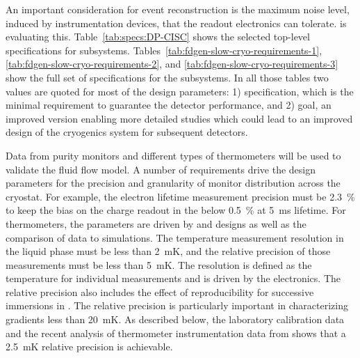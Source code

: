 An important consideration for event reconstruction is the maximum noise level, induced by instrumentation devices, that the readout electronics  can tolerate.  is evaluating this. Table~\ref{tab:specs:DP-CISC} shows the selected top-level specifications for  subsystems. 
Tables~\ref{tab:fdgen-slow-cryo-requirements-1}, \ref{tab:fdgen-slow-cryo-requirements-2}, and \ref{tab:fdgen-slow-cryo-requirements-3} show the full set of specifications
for the  subsystems. In all those tables two values are quoted for most of the design parameters: 1) specification, which is the minimal requirement to guarantee the detector performance, and 2) goal,  an improved version enabling more detailed studies which could lead to an improved design of the cryogenics system for subsequent detectors. 

Data from purity monitors and different types of thermometers will be used to validate the \lar fluid flow model. 
A number of requirements drive the design parameters for the precision and granularity of monitor distribution across the cryostat. 
For example, the electron lifetime measurement precision must be \SI{2.3}{\%} to keep the bias on the charge readout in the  below \SI{0.5}{\%} at \SI{5}{ms} lifetime.
 For thermometers, the 
parameters are driven by  and   designs as well as the comparison of  data to  simulations. The temperature measurement resolution in the liquid phase must be less than \SI{2}{mK}, and the relative precision of those measurements must be less than \SI{5}{mK}. The resolution is defined as the temperature  for individual measurements and is driven by the electronics. The relative precision also includes the effect of reproducibility for successive immersions in . 
The relative precision is particularly important in characterizing %
gradients less than \SI{20}{mK}. %
As described below, the laboratory calibration data and the recent analysis of thermometer instrumentation data from  shows that a \SI{2.5}{mK} relative precision is achievable. 


